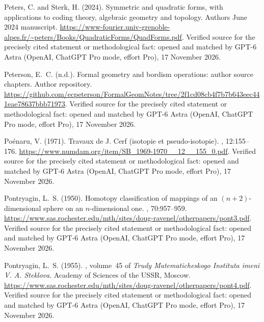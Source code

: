 \begin{thebibliography}{}
Peters, C. and Sterk, H. (2024).
\newblock Symmetric and quadratic forms, with applications to coding theory,
  algebraic geometry and topology.
\newblock Authors\textquotesingle{} June 2024 manuscript.
\newblock \url{https://www-fourier.univ-grenoble-alpes.fr/~peters/Books/QuadraticForms/QuadForms.pdf}. Verified source for the precisely cited statement or methodological fact: opened and matched by GPT-6 Astra (OpenAI, ChatGPT Pro mode, effort Pro), 17 November 2026.

Peterson, E.~C. (n.d.).
\newblock Formal geometry and bordism operations: author source chapters.
\newblock Author repository.
\newblock \url{https://github.com/ecpeterson/FormalGeomNotes/tree/2f1cd08cb4f7b7b643eec441eae78637bbb71973}. Verified source for the precisely cited statement or methodological fact: opened and matched by GPT-6 Astra (OpenAI, ChatGPT Pro mode, effort Pro), 17 November 2026.

Po{\'e}naru, V. (1971).
\newblock Travaux de {J. Cerf} (isotopie et pseudo-isotopie).
, 12:155--176.
\newblock \url{https://www.numdam.org/item/SB_1969-1970__12__155_0.pdf}. Verified source for the precisely cited statement or methodological fact: opened and matched by GPT-6 Astra (OpenAI, ChatGPT Pro mode, effort Pro), 17 November 2026.

Pontryagin, L.~S. (1950).
\newblock Homotopy classification of mappings of an $(n+2)$-dimensional sphere
  on an $n$-dimensional one.
, 70:957--959.
\newblock \url{https://www.sas.rochester.edu/mth/sites/doug-ravenel/otherpapers/pont3.pdf}. Verified source for the precisely cited statement or methodological fact: opened and matched by GPT-6 Astra (OpenAI, ChatGPT Pro mode, effort Pro), 17 November 2026.

Pontryagin, L.~S. (1955).
,
  volume~45 of {\em Trudy Matematicheskogo Instituta imeni V. A. Steklova}.
\newblock Academy of Sciences of the USSR, Moscow.
\newblock \url{https://www.sas.rochester.edu/mth/sites/doug-ravenel/otherpapers/pont4.pdf}. Verified source for the precisely cited statement or methodological fact: opened and matched by GPT-6 Astra (OpenAI, ChatGPT Pro mode, effort Pro), 17 November 2026.


\end{thebibliography}
